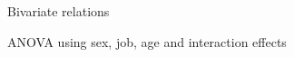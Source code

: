 \documentclass[12pt]{beamer}
\begin{document}
\begin{frame}{\textcolor{bscuro}{Bivariate relations}}	
\begin{figure}[!ht] 
	\centering
\end{figure}
\end{frame}


\begin{frame}{\textcolor{bscuro}{ANOVA using sex, job, age and interaction effects}}
	\begin{figure}[!ht] 
		\centering
	\end{figure}
\end{frame} 
\end{document}
